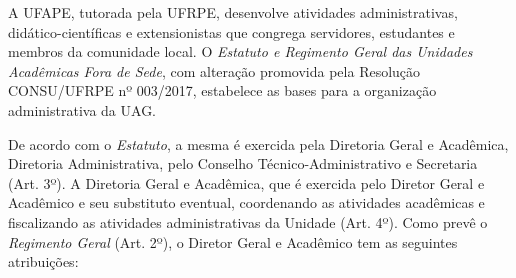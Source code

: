 \documentclass[
	12pt,				%
	openright,			%
  oneside,     %
	a4paper,			%
	chapter=TITLE,		%
	english,			%
	french,				%
	spanish,			%
	brazil				%
	]{abntex2}
\begin{document}
A UFAPE, tutorada pela UFRPE, desenvolve atividades administrativas, didático-científicas e extensionistas que congrega servidores, estudantes e membros da comunidade local. O \textit{Estatuto e Regimento Geral das Unidades Acadêmicas Fora de Sede}, com alteração promovida pela Resolução CONSU/UFRPE nº 003/2017, estabelece as bases para a organização administrativa da UAG.

De acordo com o \textit{Estatuto}, a mesma é exercida pela Diretoria Geral e Acadêmica, Diretoria Administrativa, pelo Conselho Técnico-Administrativo e Secretaria (Art. 3º). A Diretoria Geral e Acadêmica, que é exercida pelo Diretor Geral e Acadêmico e seu substituto eventual, coordenando as atividades acadêmicas e fiscalizando as atividades administrativas da Unidade (Art. 4º). Como prevê o \textit{Regimento Geral} (Art. 2º), o Diretor Geral e Acadêmico tem as seguintes atribuições:
\end{document}
